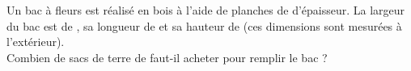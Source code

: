 \begin{exercice}
   \phantom{rrr}\par
   \begin{minipage}{\linewidth}
      Un bac à fleurs est réalisé en bois à l'aide de planches de  d'épaisseur. La largeur du bac est de , sa longueur de  et sa hauteur de  (ces dimensions sont mesurées à l'extérieur). \\
      Combien de sacs de terre de  faut-il acheter pour remplir le bac  ?
   \end{minipage}
   \begin{minipage}{\linewidth}
   \end{minipage}
\end{exercice}

